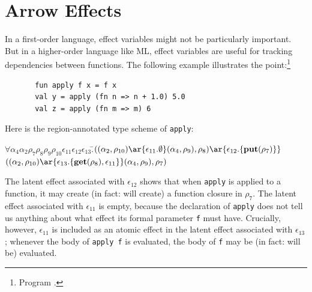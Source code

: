 \documentclass[12pt]{book}
\begin{document}
\section{Arrow Effects}
In a first-order language, effect variables might not be particularly important.
But in a higher-order language like ML, effect variables are useful for tracking
dependencies between functions. The following example illustrates the point:\footnote{Program .}
\begin{verbatim}
       fun apply f x = f x
       val y = apply (fn n => n + 1.0) 5.0
       val z = apply (fn m => m) 6
\end{verbatim}
Here is the region-annotated type scheme of {\tt apply}:
\begin{tabbing}
\qquad$\forall\alpha_4\alpha_2\rho_7\rho_8\rho_9\rho_{10}\epsilon_{11}\epsilon_{12}\epsilon_{13}.$\=$((\alpha_2,\rho_{10})
        \ar{\epsilon_{11}.\emptyset}(\alpha_4,\rho_9),\rho_8)\ar{\epsilon_{12}.\{\Put(\rho_7)\}}$\\
            \>$((\alpha_2,\rho_{10})\ar{\epsilon_{13}.\{\Get(\rho_8), \epsilon_{11}\}}(\alpha_4,\rho_9),\rho_7)$
\end{tabbing}
The latent effect associated with $\epsilon_{12}$ shows that when {\tt apply} is applied to a function,
it may create (in fact: will create) a function closure in $\rho_7$.  The latent effect associated with
$\epsilon_{11}$ is empty, because the declaration of {\tt apply} does not tell us anything about what effect
its formal parameter {\tt f} must have. Crucially, however, $\epsilon_{11}$ is included as an atomic effect
in the latent effect associated with $\epsilon_{13}$; whenever the body of {\tt apply f} is evaluated, the
body of {\tt f} may be (in fact: will be) evaluated.
\end{document}
